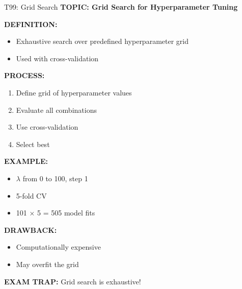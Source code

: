 \documentclass[8pt]{beamer}
\begin{document}
	\begin{frame}{T99: Grid Search}
		\fontsize{6.5}{7.5}\selectfont
		\textbf{TOPIC: Grid Search for Hyperparameter Tuning}
		
		\vspace{0.1cm}
		\textbf{DEFINITION:}
		\begin{itemize}
			\item Exhaustive search over predefined hyperparameter grid
			\item Used with cross-validation
		\end{itemize}
		
		\vspace{0.1cm}
		\textbf{PROCESS:}
		\begin{enumerate}
			\item Define grid of hyperparameter values
			\item Evaluate all combinations
			\item Use cross-validation
			\item Select best
		\end{enumerate}
		
		\vspace{0.1cm}
		\textbf{EXAMPLE:}
		\begin{itemize}
			\item $\lambda$ from 0 to 100, step 1
			\item 5-fold CV
			\item 101 × 5 = 505 model fits
		\end{itemize}
		
		\vspace{0.1cm}
		\textbf{DRAWBACK:}
		\begin{itemize}
			\item Computationally expensive
			\item May overfit the grid
		\end{itemize}
		
		\textcolor{myred}{\textbf{EXAM TRAP:}} Grid search is \textcolor{myblue}{exhaustive}!
	\end{frame}
	
\end{document}
